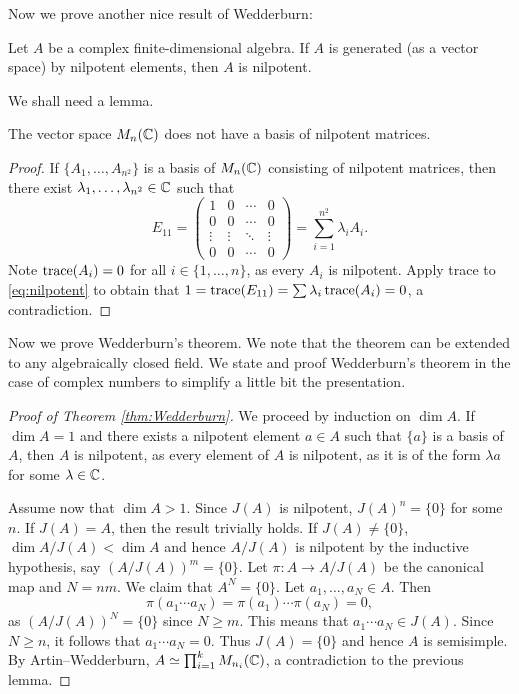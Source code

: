 Now we prove another nice result of Wedderburn:

\begin{theorem}[Wedderburn]
\label{thm:Wedderburn}
    Let $A$ be a complex finite-dimensional 
    algebra. If $A$ is generated (as a vector space) 
    by nilpotent elements, then $A$ is nilpotent. 
\end{theorem}

We shall need a lemma.

\begin{lemma}
    The vector space $M_n(\mathbb{C})$ does not have a basis of nilpotent matrices. 
\end{lemma}

\begin{proof}
    If $\{A_1,\dots,A_{n^2}\}$ is a basis of 
    $M_n(\mathbb{C})$ consisting of nilpotent matrices, 
    then there exist $\lambda_1,\dots,\lambda_{n^2}\in\mathbb{C}$ such that 
    \begin{equation}
        \label{eq:nilpotent}
        E_{11}=\begin{pmatrix}
        1&0&\cdots&0\\
        0&0&\cdots&0\\
        \vdots&\vdots&\ddots&\vdots\\
        0&0&\cdots&0
        \end{pmatrix}
        =\sum_{i=1}^{n^2}\lambda_iA_i.
    \end{equation}
    Note $\operatorname{trace}(A_i)=0$ for all $i\in\{1,\dots,n\}$, as 
    every $A_i$ is nilpotent. 
    Apply trace to \eqref{eq:nilpotent} to 
    obtain that $1=\operatorname{trace}(E_{11})=\sum\lambda_i\operatorname{trace}(A_i)=0$, a contradiction. 
\end{proof}

Now we prove Wedderburn's theorem. We note that
the theorem can be extended to any algebraically closed field. We 
state and proof Wedderburn's theorem in the case of complex numbers
to simplify a little bit the presentation. 

\begin{proof}[Proof of Theorem \ref{thm:Wedderburn}]
    We proceed by induction on $\dim A$. If $\dim A=1$ and 
    there exists a nilpotent element $a\in A$ such that 
    $\{a\}$ is a basis of $A$, then $A$ is nilpotent, 
    as every element of $A$ is nilpotent, as it is 
    of the form 
    $\lambda a$ for some $\lambda\in\mathbb{C}$. 
    
    Assume now that $\dim A>1$. Since $J(A)$ is nilpotent, $J(A)^n=\{0\}$ 
    for some $n$. If $J(A)=A$, then the result trivially holds. If $J(A)\ne\{0\}$, 
    $\dim A/J(A)<\dim A$ and hence 
    $A/J(A)$ is nilpotent by 
    the inductive hypothesis, 
    say $(A/J(A))^m=\{0\}$. Let $\pi\colon A\to A/J(A)$ be the canonical map and 
    $N=nm$. We claim that $A^N=\{0\}$. Let $a_1,\dots,a_N\in A$. Then
    \[
    \pi(a_1\cdots a_N)=\pi(a_1)\cdots\pi(a_N)=0,
    \]
    as $(A/J(A))^N=\{0\}$ since $N\geq m$. This means that 
    $a_1\cdots a_N\in J(A)$. Since $N\geq n$, 
    it follows that $a_1\cdots a_N=0$. Thus $J(A)=\{0\}$ 
    and hence $A$ is semisimple. By Artin--Wedderburn, 
    $A\simeq\prod_{i=1}^k M_{n_i}(\mathbb{C})$, a contradiction to 
    the previous lemma. 
\end{proof}

